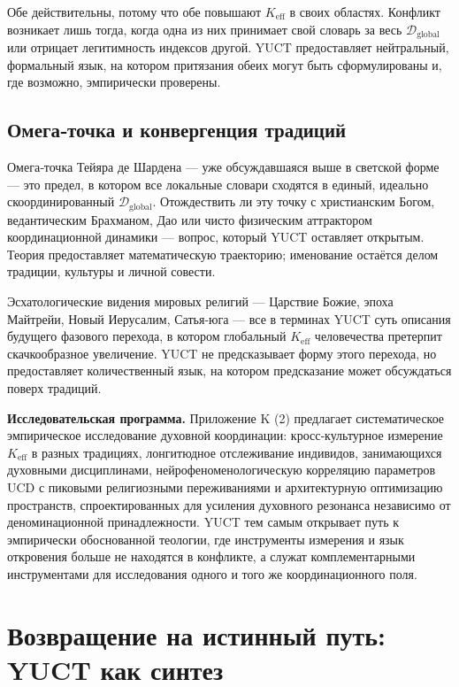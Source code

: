 \documentclass[12pt,a4paper]{article}
\begin{document}
	Обе действительны, потому что обе повышают \(K_{\mathrm{eff}}\) в своих областях. Конфликт возникает лишь тогда, когда одна из них принимает свой словарь за весь \(\mathcal{D}_{\text{global}}\) или отрицает легитимность индексов другой. YUCT предоставляет нейтральный, формальный язык, на котором притязания обеих могут быть сформулированы и, где возможно, эмпирически проверены.
	
	\subsection{Омега‑точка и конвергенция традиций}
	
	Омега‑точка Тейяра де Шардена — уже обсуждавшаяся выше в светской форме — это предел, в котором все локальные словари сходятся в единый, идеально скоординированный \(\mathcal{D}_{\text{global}}\). Отождествить ли эту точку с христианским Богом, ведантическим Брахманом, Дао или чисто физическим аттрактором координационной динамики — вопрос, который YUCT оставляет открытым. Теория предоставляет математическую траекторию; именование остаётся делом традиции, культуры и личной совести.
	
	Эсхатологические видения мировых религий — Царствие Божие, эпоха Майтрейи, Новый Иерусалим, Сатья‑юга — все в терминах YUCT суть описания будущего фазового перехода, в котором глобальный \(K_{\mathrm{eff}}\) человечества претерпит скачкообразное увеличение. YUCT не предсказывает форму этого перехода, но предоставляет количественный язык, на котором предсказание может обсуждаться поверх традиций.
	
	\textbf{Исследовательская программа.} Приложение K (2) предлагает систематическое эмпирическое исследование духовной координации: кросс‑культурное измерение \(K_{\mathrm{eff}}\) в разных традициях, лонгитюдное отслеживание индивидов, занимающихся духовными дисциплинами, нейрофеноменологическую корреляцию параметров UCD с пиковыми религиозными переживаниями и архитектурную оптимизацию пространств, спроектированных для усиления духовного резонанса независимо от деноминационной принадлежности. YUCT тем самым открывает путь к эмпирически обоснованной теологии, где инструменты измерения и язык откровения больше не находятся в конфликте, а служат комплементарными инструментами для исследования одного и того же координационного поля.
	
	\section{Возвращение на истинный путь: YUCT как синтез}
	
\end{document}
